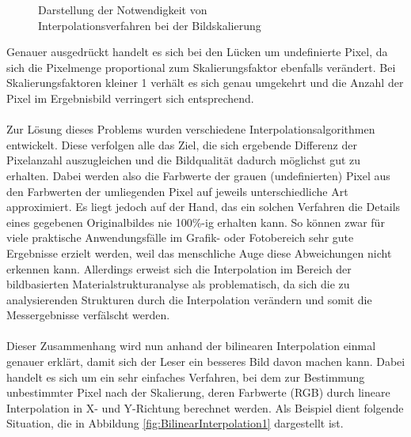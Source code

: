 \documentclass[
fontsize=10pt, 
listof = totoc,
parskip = half	
]{report}
\begin{document}
\begin{figure}[H]
	\caption{Darstellung der Notwendigkeit von\\ Interpolationsverfahren bei der Bildskalierung}
	\label{fig:ScalingProblem}
\end{figure}

\noindent Genauer ausgedrückt handelt es sich bei den Lücken um undefinierte Pixel, da sich die Pixelmenge proportional zum Skalierungsfaktor ebenfalls verändert. Bei Skalierungsfaktoren kleiner 1 verhält es sich genau umgekehrt und die Anzahl der Pixel im Ergebnisbild verringert sich entsprechend.
\\\\
\noindent Zur Lösung dieses Problems wurden verschiedene Interpolationsalgorithmen entwickelt. Diese verfolgen alle das Ziel, die sich ergebende Differenz der Pixelanzahl auszugleichen und die Bildqualität dadurch möglichst gut zu erhalten. Dabei werden also die Farbwerte der grauen (undefinierten) Pixel aus den Farbwerten der umliegenden Pixel auf jeweils unterschiedliche Art approximiert. Es liegt jedoch auf der Hand, das ein solchen Verfahren die Details eines gegebenen Originalbildes nie 100\%-ig erhalten kann. So können zwar für viele praktische Anwendungsfälle im Grafik- oder Fotobereich sehr gute Ergebnisse erzielt werden, weil das menschliche Auge diese Abweichungen nicht erkennen kann. Allerdings erweist sich die Interpolation im Bereich der bildbasierten Materialstrukturanalyse als problematisch, da sich  die zu analysierenden Strukturen durch die Interpolation verändern und somit die Messergebnisse verfälscht werden. 
\\\\
\noindent Dieser Zusammenhang wird nun anhand der bilinearen Interpolation einmal genauer erklärt, damit sich der Leser ein besseres Bild davon machen kann. Dabei handelt es sich um ein sehr einfaches Verfahren, bei dem zur Bestimmung unbestimmter Pixel nach der Skalierung, deren Farbwerte (RGB) durch lineare Interpolation in X- und Y-Richtung berechnet werden. Als Beispiel dient folgende Situation, die in Abbildung \ref{fig:BilinearInterpolation1} dargestellt ist.
\end{document}
